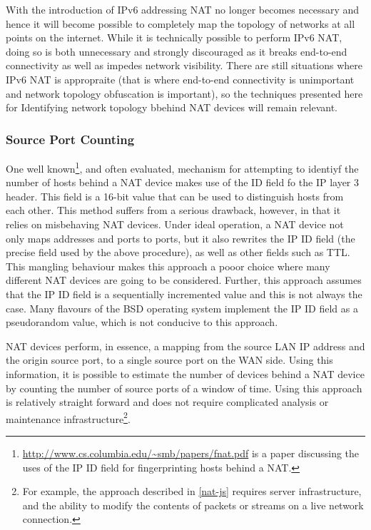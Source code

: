 \documentclass{article}
\theoremstyle{remark}
\theoremstyle{definition}
\theoremstyle{definition}
\theoremstyle{definition}
\begin{document}
With the introduction of IPv6 addressing NAT no longer becomes necessary and hence it will become possible to completely map the topology of networks at all points on the internet. While it is technically possible to perform IPv6 NAT, doing so is both unnecessary and strongly discouraged as it breaks end-to-end connectivity as well as impedes network visibility. There are still situations where IPv6 NAT is appropraite (that is where end-to-end connectivity is unimportant and network topology obfuscation is important), so the techniques presented here for Identifying network topology bbehind NAT devices will remain relevant.

\subsubsection{Source Port Counting}
One well known\footnote{\url{http://www.cs.columbia.edu/~smb/papers/fnat.pdf} is a paper discussing the uses of the IP ID field for fingerprinting hosts behind a NAT.}, and often evaluated, mechanism for attempting to identiyf the number of hosts behind a NAT device makes use of the ID field fo the IP layer 3 header. This field is a 16-bit value that can be used to distinguish hosts from each other. This method suffers from a serious drawback, however, in that it relies on misbehaving NAT devices. Under ideal operation, a NAT device not only maps addresses and ports to ports, but it also rewrites the IP ID field (the precise field used by the above procedure), as well as other fields such as TTL. This mangling behaviour makes this approach a pooor choice where many different NAT devices are going to be considered. Further, this approach assumes that the IP ID field is a sequentially incremented value and this is not always the case. Many flavours of the BSD operating system implement the IP ID field as a pseudorandom value, which is not conducive to this approach.

NAT devices perform, in essence, a mapping from the source LAN IP address and the origin source port, to a single source port on the WAN side. Using this information, it is possible to estimate the number of devices behind a NAT device by counting the number of source ports of a window of time. Using this approach is relatively straight forward and does not require complicated analysis or maintenance infrastructure\footnote{For example, the approach described in \ref{nat-js} requires server infrastructure, and the ability to modify the contents of packets or streams on a live network connection.}.
\end{document}
